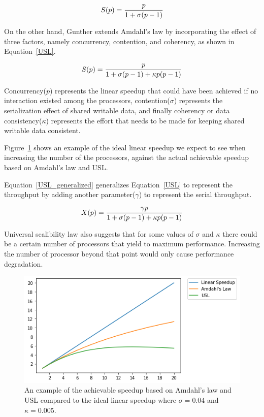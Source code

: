 \begin{equation}\label{Amdahl}
S(p) = \frac{p}{1+\sigma(p-1)}\\
\end{equation}

On the other hand, Gunther\cite{gunther2007guerrilla} extends Amdahl's law by incorporating the effect of three factors, namely concurrency, contention, and coherency, as shown in Equation~\ref{USL}.

\begin{equation}\label{USL}
S(p) = \frac{p}{1+\sigma(p-1)+\kappa{p}(p-1)}\\
\end{equation}

Concurrency($p$) represents the linear speedup that could have been achieved if no interaction existed among the processors, contention($\sigma$) represents the serialization effect of shared writable data, and finally coherency or data consistency($\kappa$) represents the effort that needs to be made for keeping shared writable data consistent\cite{gunther2007guerrilla}.    

Figure~\ref{fig_Amdahl} shows an example of the ideal linear speedup we expect to see when increasing the number of the processors, against the actual achievable speedup based on Amdahl's law and USL.

Equation~\ref{USL_generalized} generalizes Equation~\ref{USL} to represent the throughput by adding another parameter($\gamma$) to represent the serial throughput.

\begin{equation}\label{USL_generalized}
X(p) = \frac{\gamma{p}}{1+\sigma(p-1)+\kappa{p}(p-1)}\\
\end{equation}

Universal scalibility law also suggests that for some values of $\sigma$ and $\kappa$ there could be a certain number of processors that yield to maximum performance\cite{gunther2007guerrilla}. Increasing the number of processor beyond that point would only cause performance degradation.  

\begin{figure}[H]
	\centering
	\includegraphics[scale=0.8]{images/amdahls.png}
	\caption{An example of the achievable speedup based on Amdahl's law and USL compared to the ideal linear speedup where $\sigma=0.04$ and $\kappa=0.005$.}	
	\label{fig_Amdahl}
\end{figure}

